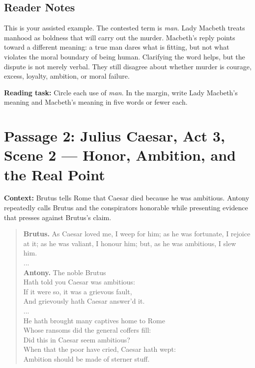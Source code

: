 \documentclass[12pt]{article}
\newenvironment{playpassage}{\begin{quote}\footnotesize\setlength{\parskip}{0.08em}\setlength{\parindent}{0pt}}{\end{quote}}
\newcommand{\speaker}[1]{\textbf{#1.}}
\begin{document}
\subsection*{Reader Notes}

This is your assisted example. The contested term is \textit{man}. Lady Macbeth treats manhood as boldness that will carry out the murder. Macbeth's reply points toward a different meaning: a true man dares what is fitting, but not what violates the moral boundary of being human. Clarifying the word helps, but the dispute is not merely verbal. They still disagree about whether murder is courage, excess, loyalty, ambition, or moral failure.

\textbf{Reading task:} Circle each use of \textit{man}. In the margin, write Lady Macbeth's meaning and Macbeth's meaning in five words or fewer each.

\newpage

\section*{Passage 2: Julius Caesar, Act 3, Scene 2 --- Honor, Ambition, and the Real Point}

\textbf{Context:} Brutus tells Rome that Caesar died because he was ambitious. Antony repeatedly calls Brutus and the conspirators honorable while presenting evidence that presses against Brutus's claim.

\begin{playpassage}
\speaker{Brutus} As Caesar loved me, I weep for him; as he was fortunate, I rejoice at it; as he was valiant, I honour him; but, as he was ambitious, I slew him.\\
...\\
\speaker{Antony} The noble Brutus\\
Hath told you Caesar was ambitious:\\
If it were so, it was a grievous fault,\\
And grievously hath Caesar answer'd it.\\
...\\
He hath brought many captives home to Rome\\
Whose ransoms did the general coffers fill:\\
Did this in Caesar seem ambitious?\\
When that the poor have cried, Caesar hath wept:\\
Ambition should be made of sterner stuff.
\end{playpassage}
\end{document}
